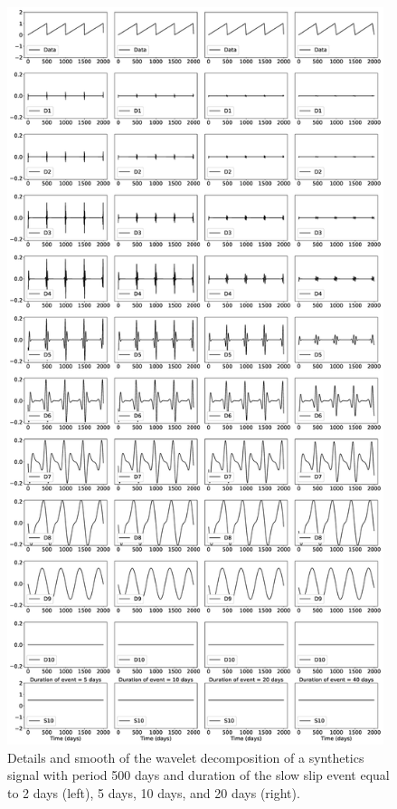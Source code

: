 \documentclass[draft]{agujournal2018}
\begin{document}
\begin{figure}
\noindent\includegraphics[width=11cm, trim={0cm 0cm 0cm 0cm},clip]{figures/500_DS.eps}
\caption{Details and smooth of the wavelet decomposition of a synthetics signal with period 500 days and duration of the slow slip event equal to 2 days (left), 5 days, 10 days, and 20 days (right).}
\label{pngfiguresample}
\end{figure}
\end{document}
